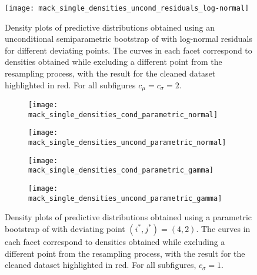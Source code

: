\documentclass[a4paper]{book}
\begin{document}
\begin{landscape}
  \begin{figure}
    \centering
    \texttt{[image: mack\_single\_densities\_uncond\_residuals\_log-normal]}
    \caption[Single outlier density plots for Mack's model, unconditional semiparametric bootstrap with log-normal residuals]{Density plots of predictive distributions obtained using an unconditional semiparametric bootstrap of  with log-normal residuals for different deviating points. The curves in each facet correspond to densities obtained while excluding a different point from the resampling process, with the result for the cleaned dataset highlighted in red. For all subfigures $c_\mu = c_\sigma = 2$.}
    \label{fig:mack-single-uncond-semiparam-log-normal}
  \end{figure}
\end{landscape}

\begin{landscape}
  \begin{figure}
    \begin{subfigure}{0.5\linewidth}
      \centering
      \texttt{[image: mack\_single\_densities\_cond\_parametric\_normal]}
    \end{subfigure}
    \begin{subfigure}{0.5\linewidth}
      \centering
      \texttt{[image: mack\_single\_densities\_uncond\_parametric\_normal]}
    \end{subfigure}
    \begin{subfigure}{0.5\linewidth}
      \centering
      \texttt{[image: mack\_single\_densities\_cond\_parametric\_gamma]}
    \end{subfigure}
    \begin{subfigure}{0.5\linewidth}
      \centering
      \texttt{[image: mack\_single\_densities\_uncond\_parametric\_gamma]}
    \end{subfigure}
    \caption[Single outlier density plots for Mack's model, parametric bootstrap]{Density plots of predictive distributions obtained using a parametric bootstrap of  with deviating point $(i^*, j^*) = (4, 2)$. The curves in each facet correspond to densities obtained while excluding a different point from the resampling process, with the result for the cleaned dataset highlighted in red. For all subfigures, $c_\sigma = 1$.}
    \label{fig:mack-single-param}
  \end{figure}
\end{landscape}
\end{document}
